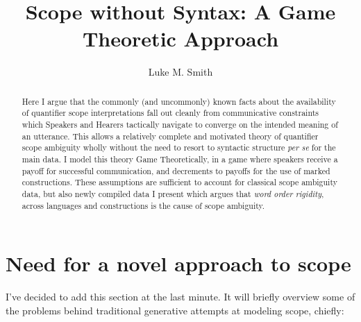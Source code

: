 \documentclass{article}
\title{Scope without Syntax: A Game Theoretic Approach}
\author{Luke M. Smith}
\begin{document}
\maketitle

\begin{abstract}
	Here I argue that the commonly (and uncommonly) known facts about the availability of quantifier scope interpretations fall out cleanly from communicative constraints which Speakers and Hearers tactically navigate to converge on the intended meaning of an utterance.
	This allows a relatively complete and motivated theory of quantifier scope ambiguity wholly without the need to resort to syntactic structure \textit{per se} for the main data.
	I model this theory Game Theoretically, in a game where speakers receive a payoff for successful communication, and decrements to payoffs for the use of marked constructions.
	These assumptions are sufficient to account for classical scope ambiguity data, but also newly compiled data I present which argues that \emph{word order rigidity}, across languages and constructions is the cause of scope ambiguity.
\end{abstract}




\section{Need for a novel approach to scope}

I've decided to add this section at the last minute. It will briefly overview some of the problems behind traditional generative attempts at modeling scope, chiefly:
\end{document}
